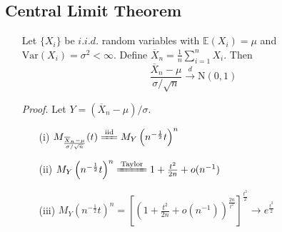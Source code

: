 \documentclass[%
 aip,
 jmp,%
 amsmath,amssymb,
 reprint,%
]{revtex4-1}
\newenvironment{note}{\color{gray}\footnotesize}{}
\def\E{\mathbb{E}}
\def\Var{\mathrm{Var}}
\def\normal{\mathrm{N}}
\newcommand{\eqtext}[1]{\xlongequal{\text{#1}}}%
\begin{document}
\subsection{Central Limit Theorem}
\begin{enumerate}
  \item[] Let $\{X_i\}$ be $i.i.d.$ random variables with
  $\E(X_i) = \mu$ and $\Var(X_i) = \sigma^2 <\infty$.
  Define $\overline{X}_n = \frac{1}{n}\sum_{i=1}^{n}X_i$. Then
  $$ \frac{\overline{X}_n - \mu}{\sigma/\sqrt{n}} \overset{d}{\to} \normal(0,1) $$

  \begin{note}
    \emph{Proof. } Let $Y =(\overline{X}_n - \mu)/\sigma$.
    \begin{enumerate}
      \item[(i)] $M_{\frac{\overline{X}_n - \mu}{\sigma/\sqrt{n}}}(t) \eqtext{iid} M_Y\left(n^{-\frac{1}{2}}t\right)^n$
      \item[(ii)]$M_Y\left(n^{-\frac{1}{2}}t\right)^n \eqtext{Taylor} 1 + \frac{t^2}{2n} + o(n^{-1})$
      \item[(iii)] $M_Y\left(n^{-\frac{1}{2}}t\right)^n = \left[\left(1 + \frac{t^2}{2n} + o(n^{-1})\right)^{\frac{2n}{t^2}}\right]^{\frac{t^2}{2}}\to e^{\frac{t^2}{2}}$
    \end{enumerate}
  \end{note}
\end{enumerate}
\end{document}
